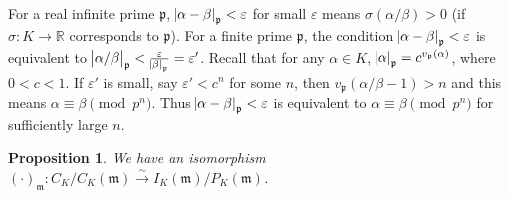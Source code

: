 \documentclass[11pt]{article}
\theoremstyle{definition}
\theoremstyle{plain}
\newtheorem{proposition}[definition]{Proposition}
\theoremstyle{remark}
\newcommand{\RR}{\mathbb{R}}
\newcommand{\fp}{\mathfrak{p}}
\newcommand{\fm}{\mathfrak{m}}
\begin{document}
For a real infinite prime $\fp$, $\abs{\alpha - \beta}_\fp < \varepsilon$ for small $\varepsilon$ means $\sigma(\alpha / \beta) > 0$ (if $\sigma : K \to \RR$ corresponds to $\fp$). For a finite prime $\fp$, the condition $\abs{\alpha - \beta}_\fp < \varepsilon$ is equivalent to $\abs{\alpha / \beta}_\fp < \frac{\varepsilon}{\abs{\beta}_\fp} = \varepsilon'$. Recall that for any $\alpha \in K$, $\abs{\alpha}_\fp = c^{v_\fp(\alpha)}$, where $0 < c < 1$. If $\varepsilon'$ is small, say $\varepsilon' < c^n$ for some $n$, then $v_\fp(\alpha/\beta - 1) > n$ and this means $\alpha \equiv \beta \pmod{p^n}$. Thus $\abs{\alpha - \beta}_\fp < \varepsilon$ is equivalent to $\alpha \equiv \beta \pmod{p^n}$ for sufficiently large $n$.

\begin{proposition}\label{prop:10_2}
    We have an isomorphism $(\cdot)_\fm : C_K/C_K(\fm) \xrightarrow{\sim} I_K(\fm) / P_K(\fm)$.
\end{proposition}
\end{document}
